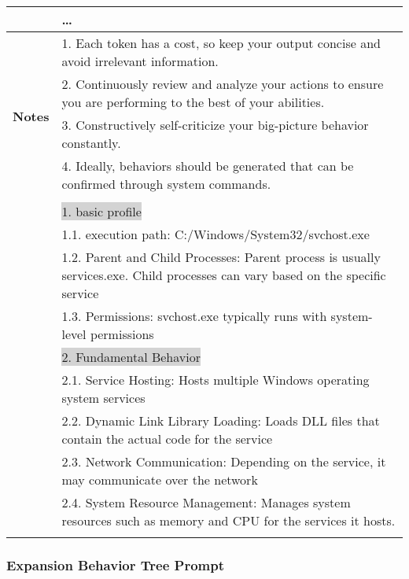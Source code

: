 \begin{tabularx}{\textwidth}{|c|X|}
& \dots \\
\hline
\multirow{5}{*}{\textbf{Notes}} 
& 1. Each token has a cost, so keep your output concise and avoid irrelevant information. \\
& 2. Continuously review and analyze your actions to ensure you are performing to the best of your abilities. \\
& 3. Constructively self-criticize your big-picture behavior constantly. \\
& 4. Ideally, behaviors should be generated that can be confirmed through system commands. \\
\hline
\textbf{\colorbox{codeorange}{LLM Response}} \\
& \colorbox{lightgray}{1. basic profile} \\
& 1.1. execution path: \colorbox{codeorange}{C:/Windows/System32/svchost.exe} \\
& 1.2. Parent and Child Processes: Parent process is usually \colorbox{codeorange}{services.exe}. Child processes can vary based on the specific service \\
& 1.3. Permissions: svchost.exe typically runs with system-level permissions \\
& \colorbox{lightgray}{2. Fundamental Behavior} \\
& 2.1. Service Hosting: Hosts multiple Windows operating system services \\
& 2.2. Dynamic Link Library Loading: Loads DLL files that contain the actual code for the service \\
& 2.3. Network Communication: Depending on the service, it may communicate over the network \\
& 2.4. System Resource Management: Manages system resources such as memory and CPU for the services it hosts. \\
\\
\hline
\end{tabularx}

\clearpage
\subsubsection{Expansion Behavior Tree Prompt}
\label{prompt-expan-tree}

